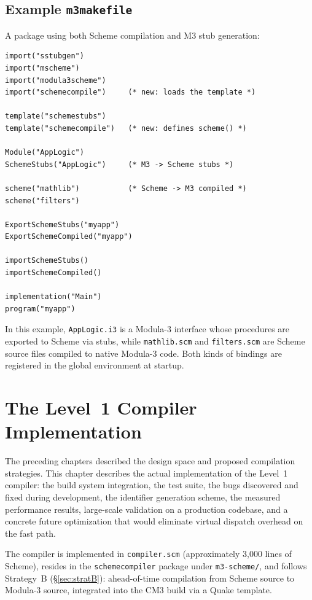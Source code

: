 \documentclass[12pt]{report}
\begin{document}
\section{Example \texttt{m3makefile}}

A package using both Scheme compilation and M3 stub generation:

\begin{lstlisting}
import("sstubgen")
import("mscheme")
import("modula3scheme")
import("schemecompile")     (* new: loads the template *)

template("schemestubs")
template("schemecompile")   (* new: defines scheme() *)

Module("AppLogic")
SchemeStubs("AppLogic")     (* M3 -> Scheme stubs *)

scheme("mathlib")           (* Scheme -> M3 compiled *)
scheme("filters")

ExportSchemeStubs("myapp")
ExportSchemeCompiled("myapp")

importSchemeStubs()
importSchemeCompiled()

implementation("Main")
program("myapp")
\end{lstlisting}

In this example, \texttt{AppLogic.i3} is a Modula-3 interface
whose procedures are exported to Scheme via stubs, while
\texttt{mathlib.scm} and \texttt{filters.scm} are Scheme source
files compiled to native Modula-3 code.  Both kinds of bindings
are registered in the global environment at startup.

\chapter{The Level~1 Compiler Implementation}
\label{ch:implementation}

The preceding chapters described the design space and proposed
compilation strategies.  This chapter describes the actual
implementation of the Level~1 compiler: the build system integration,
the test suite, the bugs discovered and fixed during development,
the identifier generation scheme, the measured performance results,
large-scale validation on a production codebase, and a concrete
future optimization that would eliminate virtual dispatch overhead
on the fast path.

The compiler is implemented in \texttt{compiler.scm} (approximately
3,000 lines of Scheme), resides in the \texttt{schemecompiler} package
under \texttt{m3-scheme/}, and follows Strategy~B
(\S\ref{sec:stratB}): ahead-of-time compilation from Scheme source to
Modula-3 source, integrated into the CM3 build via a Quake template.
\end{document}
